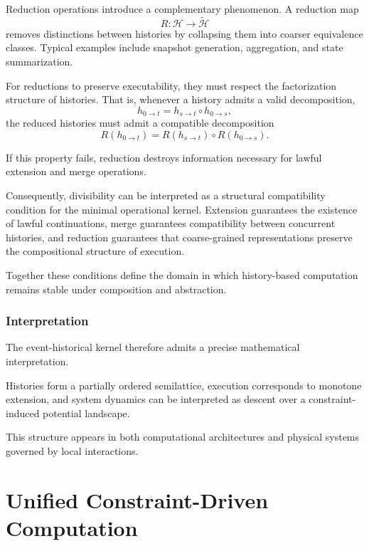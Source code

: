 \documentclass[12pt]{article}
\begin{document}
Reduction operations introduce a complementary phenomenon. A reduction
map
\[
R : \mathcal{H} \to \widetilde{\mathcal{H}}
\]
removes distinctions between histories by collapsing them into
coarser equivalence classes. Typical examples include snapshot
generation, aggregation, and state summarization.

For reductions to preserve executability, they must respect the
factorization structure of histories. That is, whenever a history
admits a valid decomposition,
\[
h_{0\to t} = h_{s\to t} \circ h_{0\to s},
\]
the reduced histories must admit a compatible decomposition
\[
R(h_{0\to t}) = R(h_{s\to t}) \circ R(h_{0\to s}).
\]

If this property fails, reduction destroys information necessary for
lawful extension and merge operations.

Consequently, divisibility can be interpreted as a structural
compatibility condition for the minimal operational kernel.
Extension guarantees the existence of lawful continuations,
merge guarantees compatibility between concurrent histories,
and reduction guarantees that coarse-grained representations
preserve the compositional structure of execution.

Together these conditions define the domain in which history-based
computation remains stable under composition and abstraction.

\subsubsection{Interpretation}

The event-historical kernel therefore admits a
precise mathematical interpretation.

Histories form a partially ordered semilattice,
execution corresponds to monotone extension,
and system dynamics can be interpreted as descent
over a constraint-induced potential landscape.

This structure appears in both computational
architectures and physical systems governed by
local interactions.


\section{Unified Constraint-Driven Computation}
\end{document}
